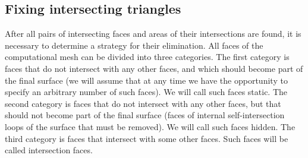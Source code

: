 \documentclass[
11pt,%
tightenlines,%
twoside,%
onecolumn,%
nofloats,%
nobibnotes,%
nofootinbib,%
superscriptaddress,%
noshowpacs,%
centertags]%
{revtex4-2}
\begin{document}
\subsection{Fixing intersecting triangles}

After all pairs of intersecting faces and areas of their intersections are found, it is necessary to determine a strategy for their elimination.
All faces of the computational mesh can be divided into three categories.
The first category is faces that do not intersect with any other faces, and which should become part of the final surface (we will assume that at any time we have the opportunity to specify an arbitrary number of such faces).
We will call such faces static.
The second category is faces that do not intersect with any other faces, but that should not become part of the final surface (faces of internal self-intersection loops of the surface that must be removed).
We will call such faces hidden.
The third category is faces that intersect with some other faces.
Such faces will be called intersection faces.
\end{document}
